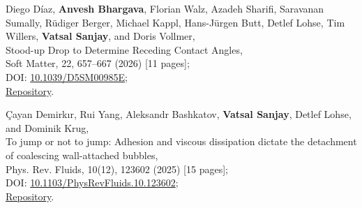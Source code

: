 	\item Diego Díaz, \textbf{Anvesh Bhargava}, Florian Walz, Azadeh Sharifi, Saravanan Sumally, Rüdiger Berger, Michael Kappl, Hans-Jürgen Butt, Detlef Lohse, Tim Willers, \textbf{Vatsal Sanjay}, and Doris Vollmer,\\
	Stood-up Drop to Determine Receding Contact Angles,\\
	Soft Matter, 22, 657--667 (2026) [11 pages];\\
	\faFile\hspace{0.2em}DOI: \href{https://doi.org/10.1039/D5SM00985E}{10.1039/D5SM00985E};\\
	\faGithub\hspace{0.2em}\href{https://github.com/comphy-lab/Retracting-Droplet}{Repository}.

	\item Çayan Demirkır, Rui Yang, Aleksandr Bashkatov, \textbf{Vatsal Sanjay}, Detlef Lohse, and Dominik Krug,\\
	To jump or not to jump: Adhesion and viscous dissipation dictate the detachment of coalescing wall-attached bubbles,\\
	Phys. Rev. Fluids, 10(12), 123602 (2025) [15 pages];\\
	\faFile\hspace{0.2em}DOI: \href{https://doi.org/10.1103/PhysRevFluids.10.123602}{10.1103/PhysRevFluids.10.123602};\\
	\faGithub\hspace{0.2em}\href{https://github.com/VatsalSy/jumping-bubbles}{Repository}.

